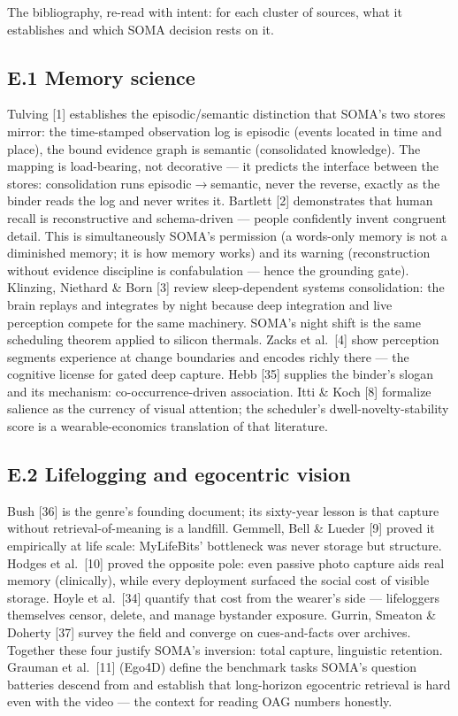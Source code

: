 The bibliography, re-read with intent: for each cluster of sources, what it establishes and which SOMA decision rests on it.

\subsection{E.1 Memory science}\label{e.1-memory-science}

Tulving {[}1{]} establishes the episodic/semantic distinction that SOMA's two stores mirror: the time-stamped observation log is episodic (events located in time and place), the bound evidence graph is semantic (consolidated knowledge). The mapping is load-bearing, not decorative --- it predicts the interface between the stores: consolidation runs episodic\(\rightarrow\)semantic, never the reverse, exactly as the binder reads the log and never writes it. Bartlett {[}2{]} demonstrates that human recall is reconstructive and schema-driven --- people confidently invent congruent detail. This is simultaneously SOMA's permission (a words-only memory is not a diminished memory; it is how memory works) and its warning (reconstruction without evidence discipline is confabulation --- hence the grounding gate). Klinzing, Niethard \& Born {[}3{]} review sleep-dependent systems consolidation: the brain replays and integrates by night because deep integration and live perception compete for the same machinery. SOMA's night shift is the same scheduling theorem applied to silicon thermals. Zacks et al.~{[}4{]} show perception segments experience at change boundaries and encodes richly there --- the cognitive license for gated deep capture. Hebb {[}35{]} supplies the binder's slogan and its mechanism: co-occurrence-driven association. Itti \& Koch {[}8{]} formalize salience as the currency of visual attention; the scheduler's dwell-novelty-stability score is a wearable-economics translation of that literature.

\subsection{E.2 Lifelogging and egocentric vision}\label{e.2-lifelogging-and-egocentric-vision}

Bush {[}36{]} is the genre's founding document; its sixty-year lesson is that capture without retrieval-of-meaning is a landfill. Gemmell, Bell \& Lueder {[}9{]} proved it empirically at life scale: MyLifeBits' bottleneck was never storage but structure. Hodges et al.~{[}10{]} proved the opposite pole: even passive photo capture aids real memory (clinically), while every deployment surfaced the social cost of visible storage. Hoyle et al.~{[}34{]} quantify that cost from the wearer's side --- lifeloggers themselves censor, delete, and manage bystander exposure. Gurrin, Smeaton \& Doherty {[}37{]} survey the field and converge on cues-and-facts over archives. Together these four justify SOMA's inversion: total capture, linguistic retention. Grauman et al.~{[}11{]} (Ego4D) define the benchmark tasks SOMA's question batteries descend from and establish that long-horizon egocentric retrieval is hard even with the video --- the context for reading OAG numbers honestly.

